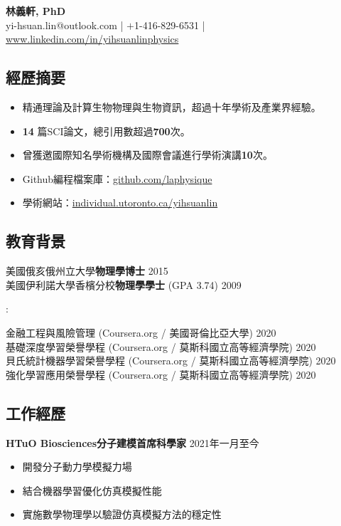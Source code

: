 \documentclass[11pt,letterpaper, sans]{article}
\makeatletter
\newcommand{\newsec}[1]{\subsection*{\hspace{-1.5pt}\Large\uppercase{\bf #1}}}
\newcommand{\newsubsec}[1]{\vspace{0.2cm}{\bf #1}\vspace{0.1cm}}
\def\name{林義軒, PhD}
\def\header{
\begin{center}
{\LARGE\bf \name} \vspace{0.3cm} \\
yi-hsuan.lin@outlook.com
| $+$1-416-829-6531 | 
\href{https://www.linkedin.com/in/yihsuanlinphysics}{www.linkedin.com/in/yihsuanlinphysics}
\end{center}
}
\makeatother
\begin{document}
\header

\begin{flushleft}





\newsec{經歷摘要}

\begin{itemize}[leftmargin=*]\itemsep-0.2em
\item 精通理論及計算生物物理與生物資訊，超過十年學術及產業界經驗。
\item {\bf 14} 篇SCI論文，總引用數超過{\bf 700}次。
\item 曾獲邀國際知名學術機構及國際會議進行學術演講{\bf 10}次。
\item Github編程檔案庫：\href{https://github.com/laphysique}{github.com/laphysique} 
\item 學術網站：\href{http://individual.utoronto.ca/yihsuanlin}{individual.utoronto.ca/yihsuanlin}
\end{itemize}

\newsec{教育背景}

美國俄亥俄州立大學{\bf 物理學博士} \hfill 2015 \\
美國伊利諾大學香檳分校{\bf 物理學學士} (GPA 3.74)  \hfill 2009

\newsubsec{學程證書}: 

金融工程與風險管理 (Coursera.org / 美國哥倫比亞大學) \hfill 2020 \\
基礎深度學習榮譽學程 (Coursera.org / 莫斯科國立高等經濟學院)  \hfill 2020 \\
貝氏統計機器學習榮譽學程 (Coursera.org / 莫斯科國立高等經濟學院)  \hfill 2020 \\
強化學習應用榮譽學程 (Coursera.org / 莫斯科國立高等經濟學院)  \hfill 2020 \\


\newsec{工作經歷}

{\bf HTuO Biosciences分子建模首席科學家} 
\hfill 2021年一月至今
\vspace{-0.5em} \\
\begin{itemize}[leftmargin=*]\itemsep-0.2em
\item 開發分子動力學模擬力場
\item 結合機器學習優化仿真模擬性能
\item 實施數學物理學以驗證仿真模擬方法的穩定性
\end{itemize}


\end{flushleft}
\end{document}
